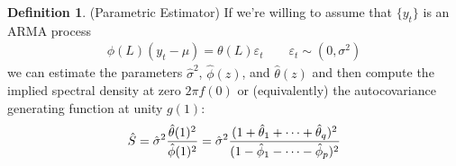 \documentclass[12pt]{article}
\theoremstyle{plain}
\theoremstyle{definition}
\newtheorem{defn}[thm]{Definition}
\theoremstyle{remark}
\begin{document}
\begin{defn}(Parametric Estimator)
If we're willing to assume that $\{y_t\}$ is an ARMA process
\begin{align*}
  \phi(L)(y_t-\mu) = \theta(L)\varepsilon_t
  \qquad \varepsilon_t\sim(0,\sigma^2)
\end{align*}
we can estimate the parameters $\hat{\sigma}^2$, $\hat{\phi}(z)$, and
$\hat{\theta}(z)$ and then compute the implied spectral density at zero
$2\pi f(0)$ or (equivalently) the autocovariance generating function at
unity $g(1)$:
\begin{align*}
  \hat{S} = \hat{\sigma}^2 \frac{\hat{\theta}(1)^2}{\hat{\phi}(1)^2}
  = \hat{\sigma}^2
  \frac{(1+\hat{\theta}_1 + \cdots + \hat{\theta}_q)^2}{%
    (1-\hat{\phi}_1 - \cdots - \hat{\phi}_p)^2}
\end{align*}
\end{defn}
\end{document}
